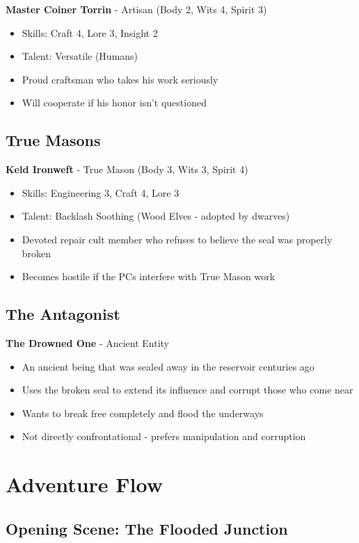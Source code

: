 \documentclass[11pt]{article}
\begin{document}
\textbf{Master Coiner Torrin} - Artisan (Body 2, Wits 4, Spirit 3)
\begin{itemize}
\item Skills: Craft 4, Lore 3, Insight 2
\item Talent: Versatile (Humans)
\item Proud craftsman who takes his work seriously
\item Will cooperate if his honor isn't questioned
\end{itemize}

\subsection{True Masons}

\textbf{Keld Ironweft} - True Mason (Body 3, Wits 3, Spirit 4)
\begin{itemize}
\item Skills: Engineering 3, Craft 4, Lore 3
\item Talent: Backlash Soothing (Wood Elves - adopted by dwarves)
\item Devoted repair cult member who refuses to believe the seal was properly broken
\item Becomes hostile if the PCs interfere with True Mason work
\end{itemize}

\subsection{The Antagonist}

\textbf{The Drowned One} - Ancient Entity
\begin{itemize}
\item An ancient being that was sealed away in the reservoir centuries ago
\item Uses the broken seal to extend its influence and corrupt those who come near
\item Wants to break free completely and flood the underways
\item Not directly confrontational - prefers manipulation and corruption
\end{itemize}

\section{Adventure Flow}

\subsection{Opening Scene: The Flooded Junction}
\end{document}
